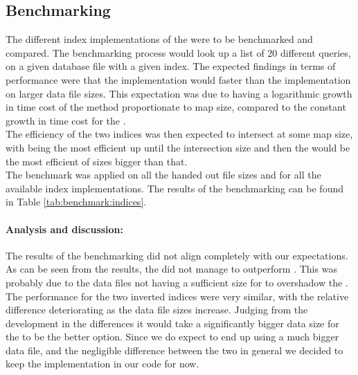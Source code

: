 \subsection{Benchmarking}
The different index implementations of the were to be benchmarked and compared. 
The benchmarking process would look up a list of 20 different queries, on a given database file with a given index. The expected findings in terms of performance were that the  implementation would faster than the  implementation on larger data file sizes. This expectation was due to  having a logarithmic growth in time cost of the  method proportionate to map size, compared to the constant growth in time cost for the . \\
The efficiency of the two indices was then expected to intersect at some map size, with  being the most efficient up until the intersection size and then the  would be the most efficient of sizes bigger than that. \\
The benchmark was applied on all the handed out file sizes and for all the available index implementations. The results of the benchmarking can be found in Table \ref{tab:benchmark:indices}.

\paragraph{Analysis and discussion:}
The results of the benchmarking did not align completely with our expectations. As can be seen from the results, the  did not manage to outperform . This was probably due to the data files not having a sufficient size for  to overshadow the . The performance for the two inverted indices were very similar, with the relative difference deteriorating as the data file sizes increase. Judging from the development in the differences it would take a significantly bigger data size for the  to be the better option. Since we do expect to end up using a much bigger data file, and the negligible difference between the two in general we decided to keep the  implementation in our code for now.

